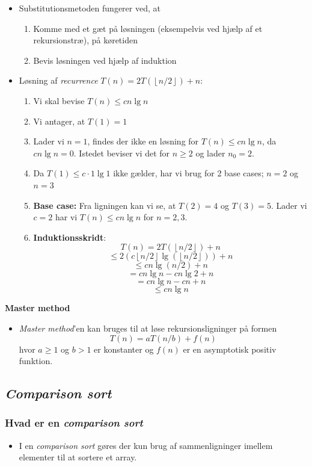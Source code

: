 \documentclass{article}
\begin{document}
\begin{itemize}
    \item Substitutionsmetoden fungerer ved, at
    \begin{enumerate}
        \item Komme med et gæt på løsningen (eksempelvis ved hjælp af et rekursionstræ), på køretiden
        \item Bevis løsningen ved hjælp af induktion
    \end{enumerate}
    \item Løsning af \textit{recurrence} $T(n) = 2T(\left \lfloor{n/2}\right \rfloor) + n$:
    \begin{enumerate}
        \item Vi skal bevise $T(n) \leq cn \lg n$
        \item Vi antager, at $T(1) = 1$
        \item Lader vi $n = 1$, findes der ikke en løsning for $T(n) \leq cn \lg n$, da $cn \lg n = 0$. Istedet beviser vi det for $n \geq 2$ og lader $n_0 = 2$.
        \item Da $T(1) \leq c \cdot 1 \lg 1$ ikke gælder, har vi brug for 2 base cases; $n = 2$ og $n = 3$ \\
        \item \textbf{Base case:} Fra ligningen kan vi se, at $T(2) = 4$ og $T(3) = 5$. Lader vi $c = 2$ har vi $T(n) \leq cn \lg n$ for $n = 2, 3$.
        \item \textbf{Induktionsskridt}:
        $$T(n) = 2T(\left \lfloor{n/2} \right \rfloor) + n$$
        $$\leq 2(c \left \lfloor{n/2} \right \rfloor \lg(\left \lfloor{n/2} \right \rfloor)) + n$$
        $$\leq cn \lg(n/2) + n$$
        $$= cn \lg n - cn \lg 2 + n$$
        $$= cn \lg n - cn + n$$
        $$\leq cn \lg n$$
    \end{enumerate}
\end{itemize}
\textbf{Master method}
\begin{itemize}
    \item \textit{Master method}'en kan bruges til at løse rekursionsligninger på formen
    $$T(n) = aT(n/b) + f(n)$$
    hvor $a \geq 1$ og $b > 1$ er konstanter og $f(n)$ er en asymptotisk positiv funktion.
\end{itemize}
\subsection*{\textit{Comparison sort}}
\subsubsection*{Hvad er en \textit{comparison sort}}
\begin{itemize}
    \item I en \textit{comparison sort} gøres der kun brug af sammenligninger imellem elementer til at sortere et array.
\end{itemize}
\end{document}
